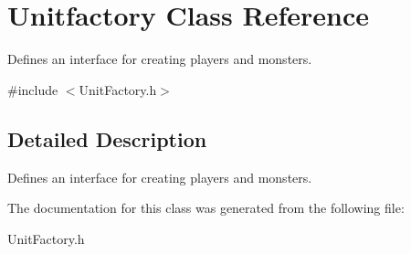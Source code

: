 \hypertarget{class_unitfactory}{}\section{Unitfactory Class Reference}
\label{class_unitfactory}


Defines an interface for creating players and monsters.  




{\ttfamily \#include $<$Unit\+Factory.\+h$>$}



\subsection{Detailed Description}
Defines an interface for creating players and monsters. 

The documentation for this class was generated from the following file\+:\begin{DoxyCompactItemize}
\item 
Unit\+Factory.\+h\end{DoxyCompactItemize}
